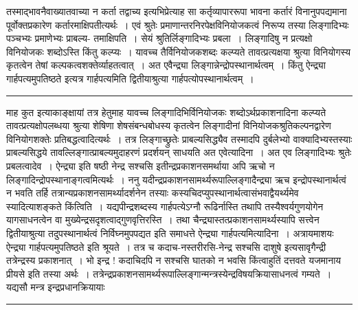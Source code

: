 \documentclass[11pt, openany]{book}
\makeatletter
\def\blfootnote{\gdef\@thefnmark{}\@footnotetext}
\makeatother
\begin{document}
 तस्माद्भावनैवाख्यातवाच्या न कर्ता तद्वाच्य इत्यभिप्रेत्याह सा कर्तृव्यापाररूपा भावना कर्तारं विनानुपपद्यमाना पूर्वोक्तप्रकारेण कर्तारमाक्षिपतीत्यर्थः~। एवं श्रुतेः प्रमाणान्तरनिरपेक्षविनियोजकत्वं निरूप्य तस्या लिङ्गादिभ्यः पञ्चभ्यः प्रमाणेभ्यः प्राबल्य-
\newpage
\fancyhead[LO]{वाच्यत्वम् ]}
{\bl\noindent तमाक्षिपति~। सेयं श्रुतिर्लिङ्गादिभ्यः प्रबला~। लिङ्गादिषु न प्रत्यक्षो विनियोजकः शब्दोऽस्ति किंतु कल्प्यः~। यावच्च तैर्विनियोजकशब्दः कल्प्यते तावत्प्रत्यक्षया श्रुत्या विनियोगस्य कृतत्वेन तेषां कल्पकत्वशक्तेर्व्याहतत्वात्~। अत एवैन्द्र्या लिङ्गान्नेन्द्रोपस्थानार्थत्वम्~। किंतु {\qtl ऐन्द्र्या गार्हपत्यमुपतिष्ठते} इत्यत्र गार्हपत्यमिति द्वितीयाश्रुत्या गार्हपत्योपस्थानार्थत्वम्~।~}\\
\hrule
\vspace{3mm}
\noindent
माह कुत इत्याकाङ्क्षायां तत्र हेतुमाह यावच्च लिङ्गादिभिर्विनियोजकः शब्दोऽर्थप्रकाशनादिना कल्प्यते तावत्प्रत्यक्षोपलब्धया श्रुत्या शेषिणा शेषसंबन्धबोधस्य कृतत्वेन लिङ्गादीनां विनियोजकश्रुतिकल्पनद्वारेण विनियोगशक्तेः प्रतिबद्धत्वादित्यर्थः~। तत्र लिङ्गाच्छ्रुतेः प्राबल्यसिद्ध्यैव तस्मादपि दुर्बलेभ्यो वाक्यादिभ्यस्तस्याः प्राबल्यसिद्धये तावल्लिङ्गात्प्राबल्यमुदाहरणं प्रदर्शयन् साधयति {\br अत एवेत्यादिना~।} अत एव लिङ्गादिभ्यः श्रुतेः प्रबलत्वादेव~। ऐन्द्र्या इति षष्ठी {\qt नेन्द्र सश्चसि} इतीन्द्रप्रकाशनसमर्थाया अपि ऋचो न लिङ्गादिन्द्रोपस्थानाङ्गत्वमित्यर्थः~। {\br ननु} यदीन्द्रप्रकाशनसामर्थ्यरूपाल्लिङ्गादैन्द्र्या ऋच इन्द्रोपस्थानार्थत्वं न भवति तर्हि तत्रान्यप्रकाशनसामर्थ्यादर्शनेन तस्याः
कस्यचिदप्युपस्थानार्थत्वासंभवाद्वैयर्थ्यमेव स्यादित्याशङ्कते {\br किंत्विति~।} यद्यपीन्द्रशब्दस्य गार्हपत्येऽग्नौ रूढिर्नास्ति तथापि तस्यैश्वर्यगुणयोगेन यागसाधनत्वेन वा
मुख्येन्द्रसदृशत्वाद्गुणवृत्तिरस्ति~। तथा चैन्द्र्यास्तत्प्रकाशनसामर्थ्यस्यापि सत्त्वेन द्वितीयाश्रुत्या तदुपस्थानार्थत्वं निर्विघ्नमुपपद्यत इति समाधत्ते {\br ऐन्द्र्या गार्हपत्यमित्यादिना~।} अत्रायमाशयः ऐन्द्र्या गार्हपत्यमुपतिष्ठते इति श्रूयते~। तत्र च {\qt कदाच-नस्तरीरसि-नेन्द्र सश्चसि दाशुषे} इत्यसावृगैन्द्री तत्रेन्द्रस्य प्रकाशनात्~। भो इन्द्र ! कदाचिदपि न सश्चसि घातको न भवसि किंत्वाहुतिं दत्तवते यजमानाय प्रीयसे इति तस्या अर्थः~। तत्रेन्द्रप्रकाशनसामर्थ्यरूपाल्लिङ्गान्मन्त्रस्येन्द्रविषयक्रियासाधनत्वं
गम्यते~। यद्यसौ मन्त्र इन्द्रप्रधानक्रियायाः
\blfootnote{पाठा०\textemdash\ $^{१}$विनियोजकः कल्प्यते~।}
\newpage
\fancyhead[RE]{[ भाव०आ०वाच्यत्वम् ]}
\hrule
\vspace{3mm}
\end{document}
